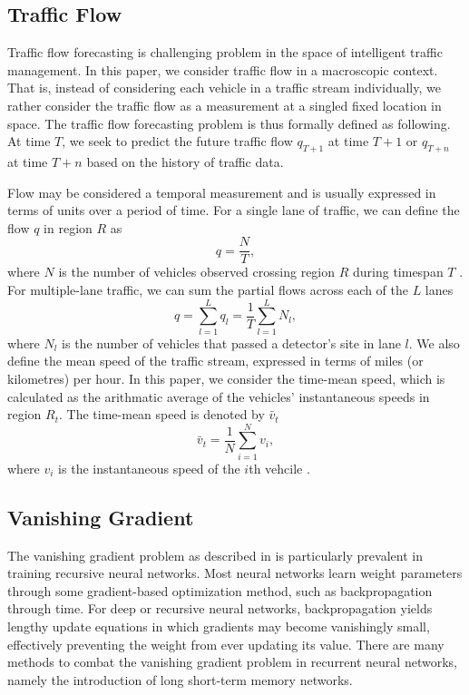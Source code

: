\documentclass{article}
\begin{document}
\subsection{Traffic Flow}
Traffic flow forecasting is challenging problem in the space of intelligent traffic management. In this paper, we consider traffic flow in a macroscopic context. That is, instead of considering each vehicle in a traffic stream individually, we rather consider the traffic flow as a measurement at a singled fixed location in space. The traffic flow forecasting problem is thus formally defined as following. At time $T$, we seek to predict the future traffic flow $q_{T+1}$ at time $T+1$ or $q_{T+n}$ at time $T+n$ based on the history of traffic data.

Flow may be considered a temporal measurement and is usually expressed in terms of units over a period of time. For a single lane of traffic, we can define the flow $q$ in region $R$ as
\begin{equation}
    q = \frac{N}{T},
\end{equation}
where $N$ is the number of vehicles observed crossing region $R$ during timespan $T$ \citep{traffic}. For multiple-lane traffic, we can sum the partial flows across each of the $L$ lanes
\begin{equation}
    q = \sum_{l=1}^{L}{q_{l}}  = \frac{1}{T}\sum_{l=1}^{L}{N_{l}},
\end{equation}
where $N_{l}$ is the number of vehicles that passed a detector's site in lane $l$. We also define the mean speed of the traffic stream, expressed in terms of miles (or kilometres) per hour. In this paper, we consider the time-mean speed, which is calculated as the arithmatic average of the vehicles' instantaneous speeds in region $R_{t}$. The time-mean speed is denoted by $\bar{v}_{t}$
\begin{equation}
    \bar{v}_{t} = \frac{1}{N}\sum_{i=1}^{N}{v_{i}},
\end{equation}
where $v_{i}$ is the instantaneous speed of the $i$th vehcile \citep{traffic}.
\subsection{Vanishing Gradient}
The vanishing gradient problem as described in \citep{vangrad} is particularly prevalent in training recursive neural networks. Most neural networks learn weight parameters through some gradient-based optimization method, such as backpropagation through time. For deep or recursive neural networks, backpropagation yields lengthy update equations in which gradients may become vanishingly small, effectively preventing the weight from ever updating its value. There are many methods to combat the vanishing gradient problem in recurrent neural networks, namely the introduction of long short-term memory networks. 
\end{document}
